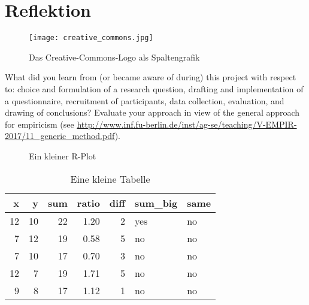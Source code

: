 \documentclass[de]{agse-empir-report}\usepackage[]{graphicx}\usepackage[]{color}
\makeatletter
\newenvironment{kframe}{%
 \def\at@end@of@kframe{}%
 \ifinner\ifhmode%
  \def\at@end@of@kframe{\end{minipage}}%
  \begin{minipage}{\columnwidth}%
 \fi\fi%
 \def\FrameCommand##1{\hskip\@totalleftmargin \hskip-\fboxsep
 \colorbox{shadecolor}{##1}\hskip-\fboxsep
     \hskip-\linewidth \hskip-\@totalleftmargin \hskip\columnwidth}%
 \MakeFramed {\advance\hsize-\width
   \@totalleftmargin\z@ \linewidth\hsize
   \@setminipage}}%
 {\par\unskip\endMakeFramed%
 \at@end@of@kframe}
\newenvironment{knitrout}{}{} %
\makeatother
\begin{document}
\lipsum[9-10]


\section[kk]{Reflektion}

\begin{figure}
    \texttt{[image: creative\_commons.jpg]}
    \caption{Das Creative-Commons-Logo als Spaltengrafik}
\end{figure}

What did you learn from (or became aware of during) this project with
respect to: choice and formulation of a research question,
drafting and implementation of a questionnaire,
recruitment of participants,
data collection, evaluation, and drawing of conclusions?
Evaluate your approach in view of the general approach for
empiricism (see
\url{http://www.inf.fu-berlin.de/inst/ag-se/teaching/V-EMPIR-2017/11_generic_method.pdf}).

\lipsum[11-13]

\begin{figure}
\begin{knitrout}
\color{fgcolor}\begin{kframe}


{\ttfamily\noindent\bfseries{}}

{\ttfamily\noindent\bfseries{}}

{\ttfamily\noindent\bfseries\color{errorcolor}{\#\# Error in print(plt): Objekt 'plt' nicht gefunden}}\end{kframe}
\end{knitrout}
    \caption{Ein kleiner R-Plot}
\end{figure}

\begin{table}
    \centering
\begin{knitrout}
\color{fgcolor}
\begin{tabular}{rrrrrll}
\toprule
x & y & sum & ratio & diff & sum\_big & same\\
\midrule
12 & 10 & 22 & 1.20 & 2 & yes & no\\
7 & 12 & 19 & 0.58 & 5 & no & no\\
7 & 10 & 17 & 0.70 & 3 & no & no\\
12 & 7 & 19 & 1.71 & 5 & no & no\\
9 & 8 & 17 & 1.12 & 1 & no & no\\
\bottomrule
\end{tabular}


\end{knitrout}
    \caption{Eine kleine Tabelle}
\end{table}
\end{document}
